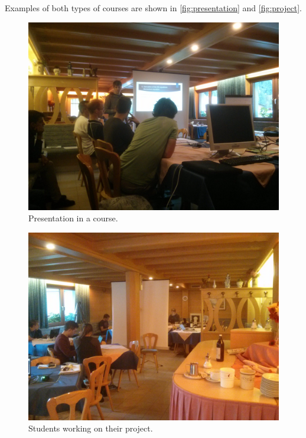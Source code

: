 Examples of both types of courses are shown in \autoref{fig:presentation} and \autoref{fig:project}.
\begin{figure}[ht]%
 	\begin{center}%
 		\includegraphics[scale=0.048]{img/Presentation.jpg}%
 		\caption{Presentation in a course.}\label{fig:presentation}%
 	\end{center}%
\end{figure}
\begin{figure}[ht]%
 	\begin{center}%
 		\includegraphics[scale=0.048]{img/Project.jpg}%
 		\caption{Students working on their project.}\label{fig:project}%
 	\end{center}%
\end{figure}

